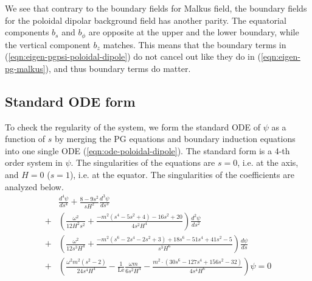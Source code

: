 We see that contrary to the boundary fields for Malkus field, the boundary fields for the poloidal dipolar background field has another parity.
The equatorial components $b_s$ and $b_\phi$ are opposite at the upper and the lower boundary, while the vertical component $b_z$ matches.
This means that the boundary terms in (\ref{eqn:eigen-pgpsi-poloidal-dipole}) do not cancel out like they do in (\ref{eqn:eigen-pg-malkus}), and thus boundary terms do matter.


\subsection{Standard ODE form}

To check the regularity of the system, we form the standard ODE of $\psi$ as a function of $s$ by merging the PG equations and boundary induction equations into one single ODE (\ref{eqn:ode-poloidal-dipole}).
The standard form is a 4-th order system in $\psi$. The singularities of the equations are $s=0$, i.e. at the axis, and $H=0$ ($s=1$), i.e. at the equator. The singularities of the coefficients are analyzed below.
\begin{equation}
\begin{aligned}\label{eqn:ode-poloidal-dipole}
    &\frac{d^{4}\psi}{d s^{4}} + \frac{8 - 9 s^{2}}{sH^{2}} \frac{d^{3}\psi}{d s^{3}} \\
    +& \left(\frac{\omega^{2}}{12 H^{2} s^{2}} + \frac{- m^{2} \left(s^{4} - 5 s^{2} + 4\right) - 16 s^{2} + 20}{4 s^{2} H^{4}}\right) \frac{d^{2}\psi}{d s^{2}} \\
    +& \left(\frac{\omega^{2}}{12 s^{3} H^{4}} + \frac{- m^{2} \left(s^{6} - 2 s^{4} - 2 s^{2} + 3\right) + 18 s^{6} - 51 s^{4} + 41 s^{2} - 5}{s^3 H^{6}}\right) \frac{d\psi}{d s} \\
    +& \left(\frac{\omega^{2} m^{2} \left(s^2 - 2\right)}{24 s^{4} H^{4}} - \frac{1}{\mathrm{Le}} \frac{\omega m}{6 s^{2} H^{4}} - \frac{m^{2} \cdot \left(30 s^{6} - 127 s^{4} + 156 s^{2} - 32\right)}{4 s^{4} H^{6}}\right) \psi = 0
\end{aligned}
\end{equation}

